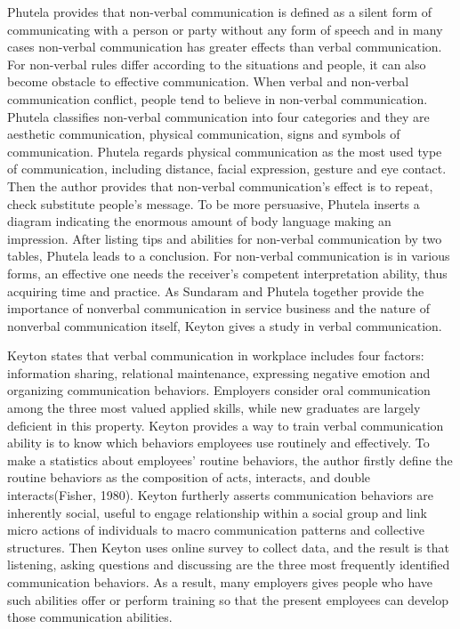 \documentclass[12pt]{article}
\begin{document}
\begin{flushleft}
Phutela provides that non-verbal communication is defined as a silent form of
communicating with a person or party without any form of speech and in many
cases non-verbal communication has greater effects than verbal communication.
For non-verbal rules differ according to the situations and people, it
can also become obstacle to effective communication.
When verbal and non-verbal communication conflict, people tend to believe in
non-verbal communication.
Phutela classifies non-verbal communication into four categories and they are
aesthetic communication, physical communication, signs and symbols of
communication.
Phutela regards physical communication as the most used type of communication,
including distance, facial expression, gesture and eye contact.
Then the author provides that non-verbal communication’s effect is to repeat,
check substitute people’s message.
To be more persuasive, Phutela inserts a diagram indicating the enormous amount
of body language making an impression.
After listing tips and abilities for non-verbal communication by two tables,
Phutela leads to a conclusion.
For non-verbal communication is in various forms, an effective one needs the
receiver’s competent interpretation ability, thus acquiring time and practice.
As Sundaram and Phutela together provide the importance of nonverbal 
communication in service business and the nature of nonverbal communication
itself, Keyton gives a study in verbal communication.

Keyton states that verbal communication in workplace includes four factors:
information sharing, relational maintenance, expressing negative emotion and
organizing communication behaviors. Employers consider oral communication among
the three most valued applied skills, while new graduates are largely deficient
in this property. Keyton provides a way to train verbal communication ability is
to know which behaviors employees use routinely and effectively. To make a
statistics about employees' routine behaviors, the author firstly define the
routine behaviors as the composition of acts, interacts, and double
interacts(Fisher, 1980). Keyton furtherly asserts communication behaviors are
inherently social, useful to engage relationship within a social group and link
micro actions of individuals to macro communication patterns and collective
structures.
Then Keyton uses online survey to collect data, and the result is that
listening, asking questions and discussing are the three most frequently
identified communication behaviors. As a result, many employers gives people who
have such abilities offer or perform training so that the present employees can
develop those communication abilities.





\end{flushleft}
\end{document}
